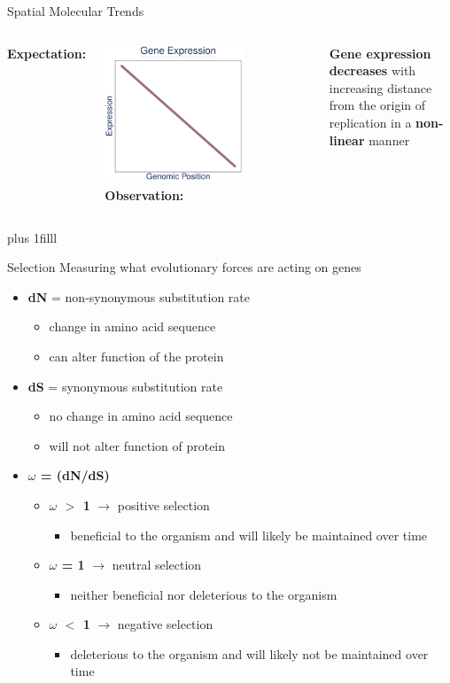 \documentclass{beamer}
\makeatletter
\newcommand{\bi}{\begin{itemize}}
\newcommand{\ei}{\end{itemize}}
\newcommand{\sourceright}[1]{\begin{textblock*}{}
		\begin{beamercolorbox}[ht=0.5cm,left]{framesource}
			\usebeamerfont{framesource}\usebeamercolor[berry]{framesource}
			{#1}
		\end{beamercolorbox}
	\end{textblock*}}
\newcommand{\itm}{\item<itm@1->}
\newcommand{\btVFill}{\vskip0pt plus 1filll}
\makeatother
\begin{document}
\begin{frame}{Spatial Molecular Trends}
	\begin{columns}[t]
		\textbf{Expectation: }
		\centering
		\bigskip
		
		\includegraphics[width=0.67\textwidth]{./exp_graph.pdf}
		\textbf{Observation: }
		\bigskip 
		
		\textbf{Gene expression decreases} with increasing distance from the origin of replication in a \textbf{non-linear} manner
	\end{columns}
	
	\btVFill
	\tiny \vspace{-\baselineskip}\color{berry}{Couturier et al. 2006, Cooper et al. 2010, Sharp et al. 2005, Morrow et al. 2012, Cooper and Rocha 2006}
	
\end{frame}

\begin{frame}{Selection}
	Measuring what evolutionary forces are acting on genes
	\pause
	\bi
	\itm \textbf{dN} = non-synonymous substitution rate
		\bi
		\itm change in amino acid sequence
		\itm can alter function of the protein
		\ei
		\pause
	\itm \textbf{dS} = synonymous substitution rate
		\bi
		\itm no change in amino acid sequence
		\itm will not alter function of protein
		\ei
		\pause
	\itm \textbf{ $\omega$ = (dN/dS)}
	\pause
		\bi
		\itm \textbf{$\omega$ $>$ 1} $\rightarrow$ positive selection
			\bi
			\itm beneficial to the organism and will likely be maintained over time
			\ei
			\pause
		\itm \textbf{$\omega$ = 1} $\rightarrow$ neutral selection
			\bi
			\itm neither beneficial nor deleterious to the organism
			\ei
			\pause
		\itm \textbf{$\omega$ $<$ 1} $\rightarrow$ negative selection
			\bi
			\itm deleterious to the organism and will likely not be maintained over time
			\ei
		\ei
	\ei
\end{frame}
\end{document}
